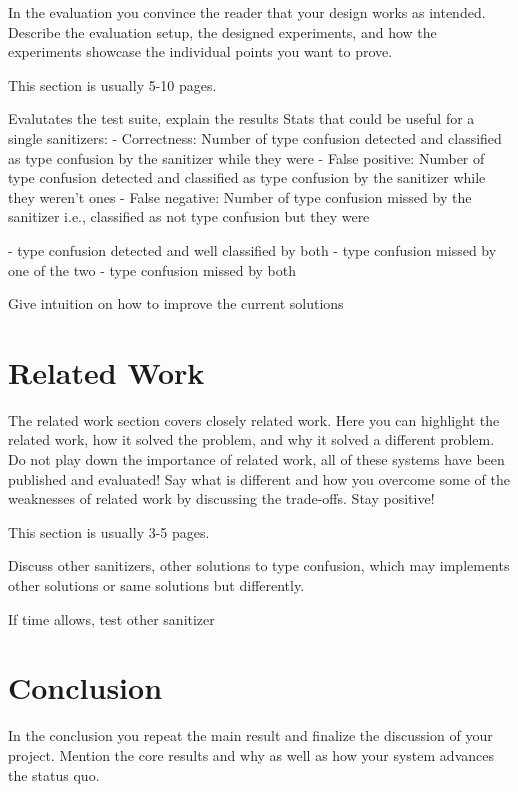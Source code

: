 \documentclass[a4paper,11pt,oneside]{report}
\begin{document}
In the evaluation you convince the reader that your design works as intended.
Describe the evaluation setup, the designed experiments, and how the
experiments showcase the individual points you want to prove.

This section is usually 5-10 pages.

Evalutates the test suite, explain the results
Stats that could be useful for a single sanitizers:
- Correctness: Number of type confusion detected and classified as type confusion by the sanitizer while they were
- False positive: Number of type confusion detected and classified as type confusion by the sanitizer while they weren't ones
- False negative: Number of type confusion missed by the sanitizer i.e., classified as not type confusion but they were

- type confusion detected and well classified by both
- type confusion missed by one of the two
- type confusion missed by both

Give intuition on how to improve the current solutions

\chapter{Related Work}

The related work section covers closely related work. Here you can highlight
the related work, how it solved the problem, and why it solved a different
problem. Do not play down the importance of related work, all of these
systems have been published and evaluated! Say what is different and how
you overcome some of the weaknesses of related work by discussing the 
trade-offs. Stay positive!

This section is usually 3-5 pages.

Discuss other sanitizers, other solutions to type confusion,
which may implements other solutions or same solutions but differently.

If time allows, test other sanitizer




\chapter{Conclusion}

In the conclusion you repeat the main result and finalize the discussion of
your project. Mention the core results and why as well as how your system
advances the status quo.
\end{document}
